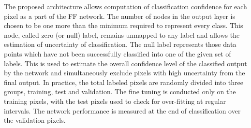 The proposed architecture allows computation of classification confidence for each pixel as a part of the FF network. The number of nodes in the output layer is chosen to be one more than the minimum required to represent every class. This node, called zero (or null) label, remains unmapped to any label and allows the estimation of uncertainty of classification.
The null label represents those data points which have not been successfully classified into one of the given set of labels.
This is used to estimate the overall confidence level of the classified output by the network and simultaneously exclude pixels with high uncertainty from the final output. 
In practice, the total labeled pixels are randomly divided into three groups, training, test and validation. The fine tuning is conducted only on the training pixels, with the test pixels used to check for over-fitting at regular intervals. The network performance is measured at the end of classification over the validation pixels. 

 





